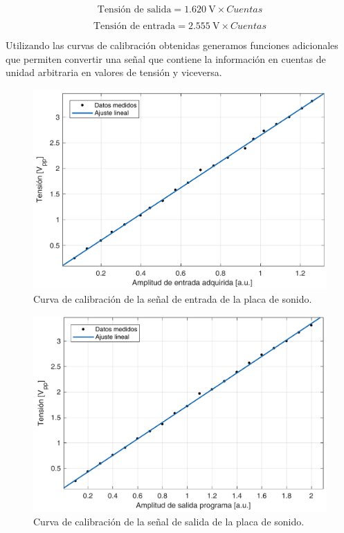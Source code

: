 \documentclass[a4paper,11pt]{article}
\begin{document}
\begin{equation*}
	 \text{Tensión de salida} = \SI{1.620}{\V} \times Cuentas%
\end{equation*}

\begin{equation*}
	\text{Tensión de entrada} = \SI{2.555}{\V} \times Cuentas%
\end{equation*}

Utilizando las curvas de calibración obtenidas generamos funciones
adicionales que permiten convertir una señal que contiene la información
en cuentas de unidad arbitraria en valores de tensión y viceversa.

	\begin{figure}[!h]
		\centering
		\includegraphics[width=\textwidth]{imagenes/CalibracionEntrada.pdf}
		\caption{Curva de calibración de la señal de entrada de la placa
de sonido.}
        \label{fig:CalibracionEntrada}
	\end{figure}
	
	\begin{figure}[!h]
		\centering
		\includegraphics[width=\textwidth]{imagenes/CalibracionSalida.pdf}
		\caption{Curva de calibración de la señal de salida de la placa
de sonido.}
        \label{fig:CalibracionSalida}
	\end{figure}
\end{document}
